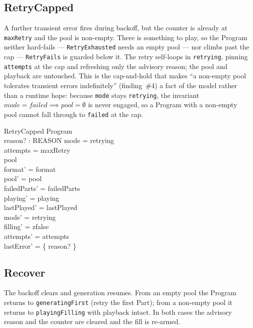 \documentclass[a4paper,10pt,fleqn]{article}
\begin{document}
\subsection{RetryCapped}

A further transient error fires during backoff, but the counter is already at
\texttt{maxRetry} and the pool is non-empty. There is something to play, so the
Program neither hard-fails --- \texttt{RetryExhausted} needs an empty pool ---
nor climbs past the cap --- \texttt{RetryFails} is guarded below it. The retry
self-loops in \texttt{retrying}, pinning \texttt{attempts} at the cap and
refreshing only the advisory reason; the pool and playback are untouched. This
is the cap-and-hold that makes ``a non-empty pool tolerates transient errors
indefinitely'' (finding~\#4) a fact of the model rather than a runtime hope:
because \texttt{mode} stays \texttt{retrying}, the invariant
$mode = failed \implies pool = \emptyset$ is never engaged, so a Program with a
non-empty pool cannot fall through to \texttt{failed} at the cap.

\begin{schema}{RetryCapped}
  \Delta Program \\
  reason? : REASON
  \where
  mode = retrying \\
  attempts = maxRetry \\
  pool \neq \emptyset \\
  format' = format \\
  pool' = pool \\
  failedParts' = failedParts \\
  playing' = playing \\
  lastPlayed' = lastPlayed \\
  mode' = retrying \\
  filling' = zfalse \\
  attempts' = attempts \\
  lastError' = \{ reason? \}
\end{schema}

\subsection{Recover}

The backoff clears and generation resumes. From an empty pool the Program
returns to \texttt{generatingFirst} (retry the first Part); from a non-empty
pool it returns to \texttt{playingFilling} with playback intact. In both cases
the advisory reason and the counter are cleared and the fill is re-armed.
\end{document}
